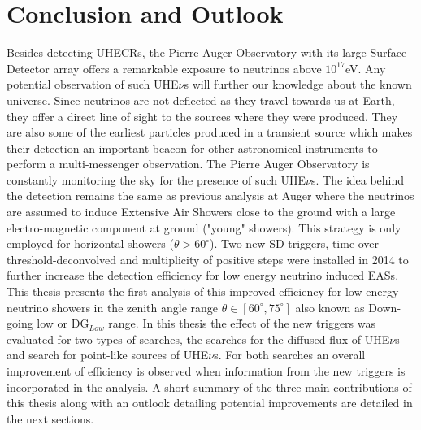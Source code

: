 
\chapter{Conclusion and Outlook}
\label{chap:conc}

Besides detecting \glspl{UHECR}, the Pierre Auger Observatory with its large Surface Detector array offers a remarkable exposure to neutrinos above $10^{17}$eV. Any potential observation of such UHE$\nu$s will further our knowledge about the known universe. Since neutrinos are not deflected as they travel towards us at Earth, they offer a direct line of sight to the sources where they were produced. They are also some of the earliest particles produced in a transient source which makes their detection an important beacon for other astronomical instruments to perform a multi-messenger observation. The Pierre Auger Observatory is constantly monitoring the sky for the presence of such UHE$\nu$s. The idea behind the detection remains the same as previous analysis at Auger where the neutrinos are assumed to induce Extensive Air Showers close to the ground with a large electro-magnetic component at ground ("young" showers). This strategy is only employed for horizontal showers ($\theta > 60^{\circ}$). Two new SD triggers, time-over-threshold-deconvolved and multiplicity of positive steps were installed in 2014 to further increase the detection efficiency for low energy neutrino induced EASs. This thesis presents the first analysis of this improved efficiency for low energy neutrino showers in the zenith angle range $\theta \in [60^{\circ},75^\circ]$ also known as Down-going low or DG$_{Low}$ range. In this thesis the effect of the new triggers was evaluated for two types of searches, the searches for the diffused flux of UHE$\nu$s and search for point-like sources of UHE$\nu$s. For both searches an overall improvement of efficiency is observed when information from the new triggers is incorporated in the analysis. A short summary of the three main contributions of this thesis along with an outlook detailing potential improvements are detailed in the next sections. 
